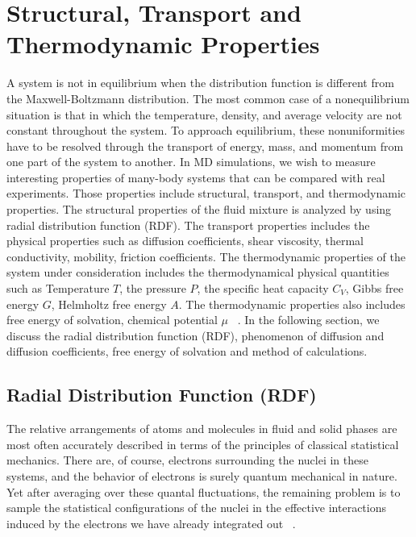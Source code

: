  \section{Structural, Transport and Thermodynamic Properties}
  A system is not in equilibrium when the distribution function is different from the Maxwell-Boltzmann distribution. The most common case of a nonequilibrium situation is that in which the temperature, density, and average velocity are not constant throughout the system. To approach equilibrium, these nonuniformities have to be resolved through the transport of energy, mass, and momentum
 from one part of the system to another. In MD simulations, we wish to measure interesting properties of many-body systems that can be compared with real experiments. Those properties   include structural, transport, and  thermodynamic properties. The structural properties of the fluid mixture is analyzed by using radial distribution function (RDF). The transport properties includes the physical properties such as  diffusion coefficients, shear viscosity, thermal conductivity, mobility, friction coefficients. The thermodynamic properties of the system under consideration includes the thermodynamical physical quantities such as Temperature $T$, the pressure $P$, the specific heat capacity $C_V$, Gibbs free energy $G$, Helmholtz free energy $A$. The thermodynamic properties also includes free energy of solvation, chemical potential $\mu$ ~\citep{huang2009, Frenkel2002}. In the following section, we  discuss the radial distribution function (RDF), phenomenon of diffusion and diffusion coefficients, free energy of solvation and method of calculations.
 \subsection{Radial Distribution Function (RDF)}
  The relative arrangements of atoms and molecules in fluid and solid phases are most often accurately described in terms of the principles of classical statistical mechanics. There are, of course, electrons surrounding the nuclei in these systems, and the behavior of electrons is surely quantum mechanical in nature. Yet after averaging over these quantal fluctuations, the remaining problem is to sample the statistical configurations of the nuclei in the effective interactions induced by the electrons we have already integrated out~ \citep{chandler1987}.
  
